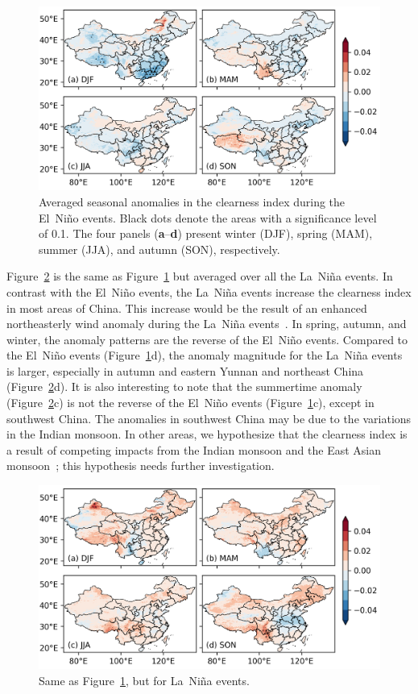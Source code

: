 \documentclass[atmosphere,article,accept,pdftex,moreauthors]{Definitions/mdpi}
\begin{document}
\begin{figure}[H]
    \includegraphics[width=14cm]{fig/anom_elnino.png}
  \caption{Averaged seasonal anomalies in the clearness index during the El~Niño events. Black dots denote the areas with a significance level of 0.1. The four panels (\textbf{a}--\textbf{d}) present winter (DJF), spring (MAM), summer (JJA), and autumn (SON), respectively.\label{fig:elnino}}
\end{figure}

Figure~\ref{fig:lanina} is the same as Figure~\ref{fig:elnino} but averaged over all the La~Niña events. In contrast with the El~Niño events, the La~Niña events increase the clearness index in most areas of China. This increase would be the result of an enhanced northeasterly wind anomaly during the La~Niña events~\cite{sun2018JGRA}. In spring, autumn, and winter, the anomaly patterns are the reverse of the El~Niño events. Compared to the El~Niño events (Figure~\ref{fig:elnino}d), the anomaly magnitude for the La~Niña events is larger, especially in autumn and eastern Yunnan and northeast China (Figure~\ref{fig:lanina}d). It is also interesting to note that the summertime anomaly (Figure~\ref{fig:lanina}c) is not the reverse of the El~Niño events (Figure~\ref{fig:elnino}c), except in southwest China. The anomalies in southwest China may be due to the variations in the Indian monsoon. In other areas, we hypothesize that the clearness index is a result of competing impacts from the Indian monsoon and the East Asian monsoon~\cite{wang2012JGRA}; this hypothesis needs further investigation.

\begin{figure}[H]
    \includegraphics[width=14cm]{fig/anom_lanina.png}
  \caption{Same as Figure~\ref{fig:elnino}, but for La~Niña events. \label{fig:lanina}}
\end{figure}
\end{document}
